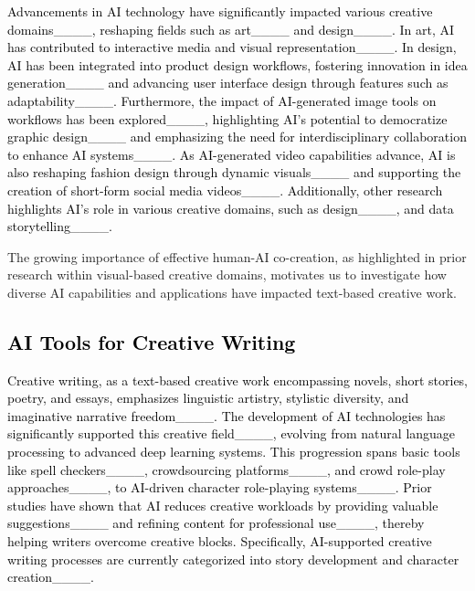 \textcolor{black}{Advancements in AI technology have significantly impacted various creative domains____, reshaping fields such as art____ and design____. In art, AI has contributed to interactive media and visual representation____. In design, AI has been integrated into product design workflows, fostering innovation in idea generation____ and advancing user interface design through features such as adaptability____. Furthermore, the impact of AI-generated image tools on workflows has been explored____, highlighting AI’s potential to democratize graphic design____ and emphasizing the need for interdisciplinary collaboration to enhance AI systems____. As AI-generated video capabilities advance, AI is also reshaping fashion design through dynamic visuals____ and supporting the creation of short-form social media videos____. Additionally, other research highlights AI's role in various creative domains, such as design____, and data storytelling____.}


The growing importance of effective human-AI co-creation, as highlighted in prior research within visual-based creative domains, motivates us to investigate how diverse AI capabilities and applications have impacted text-based creative work.




\subsection{\textcolor{black}{AI Tools for Creative Writing}}
\textcolor{black}{Creative writing, as a text-based creative work encompassing novels, short stories, poetry, and essays, emphasizes linguistic artistry, stylistic diversity, and imaginative narrative freedom____. The development of AI technologies has significantly supported this creative field____, evolving from natural language processing to advanced deep learning systems. This progression spans basic tools like spell checkers____, crowdsourcing platforms____, and crowd role-play approaches____, to AI-driven character role-playing systems____. Prior studies have shown that AI reduces creative workloads by providing valuable suggestions____ and refining content for professional use____, thereby helping writers overcome creative blocks. Specifically, AI-supported creative writing processes are currently categorized into story development and character creation____.}

